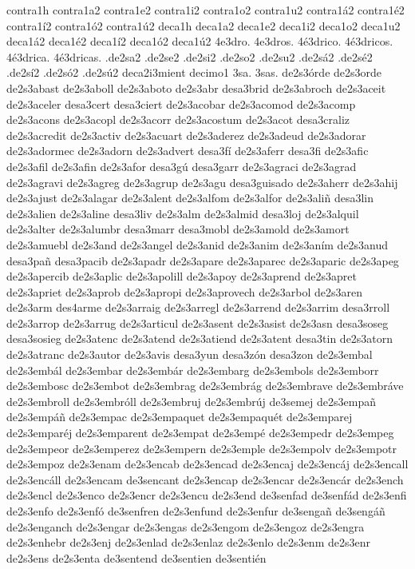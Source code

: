 {contra1h
contra1a2 contra1e2 contra1i2 contra1o2 contra1u2
contra1á2 contra1é2 contra1í2 contra1ó2 contra1ú2
deca1h
deca1a2 deca1e2 deca1i2 deca1o2 deca1u2
deca1á2 deca1é2 deca1í2 deca1ó2 deca1ú2
4e3dro.
4e3dros.
4é3drico.
4é3dricos.
4é3drica.
4é3dricas.
.de2sa2 .de2se2 .de2si2 .de2so2 .de2su2
.de2sá2 .de2sé2 .de2sí2 .de2só2 .de2sú2
deca2i3mient
decimo1
3sa.
3sas.
de2s3órde
de2s3orde
de2s3abast
de2s3aboll
de2s3aboto
de2s3abr
desa3brid
de2s3abroch
de2s3aceit
de2s3aceler
desa3cert
desa3ciert
de2s3acobar
de2s3acomod
de2s3acomp
de2s3acons
de2s3acopl
de2s3acorr
de2s3acostum
de2s3acot
desa3craliz
de2s3acredit
de2s3activ
de2s3acuart
de2s3aderez
de2s3adeud
de2s3adorar
de2s3adormec
de2s3adorn
de2s3advert
desa3fí
de2s3aferr
desa3fi
de2s3afic
de2s3afil
de2s3afin
de2s3afor
desa3gú
desa3garr
de2s3agraci
de2s3agrad
de2s3agravi
de2s3agreg
de2s3agrup
de2s3agu
desa3guisado
de2s3aherr
de2s3ahij
de2s3ajust
de2s3alagar
de2s3alent
de2s3alfom
de2s3alfor
de2s3aliñ
desa3lin
de2s3alien
de2s3aline
desa3liv
de2s3alm
de2s3almid
desa3loj
de2s3alquil
de2s3alter
de2s3alumbr
desa3marr
desa3mobl
de2s3amold
de2s3amort
de2s3amuebl
de2s3and
de2s3angel
de2s3anid
de2s3anim
de2s3aním
de2s3anud
desa3pañ
desa3pacib
de2s3apadr
de2s3apare
de2s3aparec
de2s3aparic
de2s3apeg
de2s3apercib
de2s3aplic
de2s3apolill
de2s3apoy
de2s3aprend
de2s3apret
de2s3apriet
de2s3aprob
de2s3apropi
de2s3aprovech
de2s3arbol
de2s3aren
de2s3arm
des4arme
de2s3arraig
de2s3arregl
de2s3arrend
de2s3arrim
desa3rroll
de2s3arrop
de2s3arrug
de2s3articul
de2s3asent
de2s3asist
de2s3asn
desa3soseg
desa3sosieg
de2s3atenc
de2s3atend
de2s3atiend
de2s3atent
desa3tin
de2s3atorn
de2s3atranc
de2s3autor
de2s3avis
desa3yun
desa3zón
desa3zon
de2s3embal
de2s3embál
de2s3embar
de2s3embár
de2s3embarg
de2s3embols
de2s3emborr
de2s3embosc
de2s3embot
de2s3embrag
de2s3embrág
de2s3embrave
de2s3embráve
de2s3embroll
de2s3embróll
de2s3embruj
de2s3embrúj
de3semej
de2s3empañ
de2s3empáñ
de2s3empac
de2s3empaquet
de2s3empaquét
de2s3emparej
de2s3emparéj
de2s3emparent
de2s3empat
de2s3empé
de2s3empedr
de2s3empeg
de2s3empeor
de2s3emperez
de2s3empern
de2s3emple
de2s3empolv
de2s3empotr
de2s3empoz
de2s3enam
de2s3encab
de2s3encad
de2s3encaj
de2s3encáj
de2s3encall
de2s3encáll
de2s3encam
de3sencant
de2s3encap
de2s3encar
de2s3encár
de2s3ench
de2s3encl
de2s3enco
de2s3encr
de2s3encu
de2s3end
de3senfad
de3senfád
de2s3enfi
de2s3enfo
de2s3enfó
de3senfren
de2s3enfund
de2s3enfur
de3sengañ
de3sengáñ
de2s3enganch
de2s3engar
de2s3engas
de2s3engom
de2s3engoz
de2s3engra
de2s3enhebr
de2s3enj
de2s3enlad
de2s3enlaz
de2s3enlo
de2s3enm
de2s3enr
de2s3ens
de2s3enta
de3sentend
de3sentien
de3sentién
}
